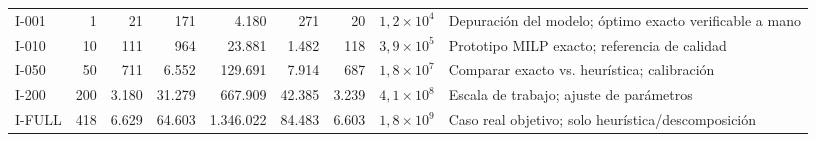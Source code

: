 
\begin{tabular}{l r r r r r r r L{3.4cm}}
 &  &  &  &  &  &  &  &  \\
\midrule
I-001 & 1 & 21 & 171 & 4.180 & 271 & 20 & $1{,}2\times 10^{4}$ & Depuración del modelo; óptimo exacto verificable a mano \\
I-010 & 10 & 111 & 964 & 23.881 & 1.482 & 118 & $3{,}9\times 10^{5}$ & Prototipo MILP exacto; referencia de calidad \\
I-050 & 50 & 711 & 6.552 & 129.691 & 7.914 & 687 & $1{,}8\times 10^{7}$ & Comparar exacto vs. heurística; calibración \\
I-200 & 200 & 3.180 & 31.279 & 667.909 & 42.385 & 3.239 & $4{,}1\times 10^{8}$ & Escala de trabajo; ajuste de parámetros \\
I-FULL & 418 & 6.629 & 64.603 & 1.346.022 & 84.483 & 6.603 & $1{,}8\times 10^{9}$ & Caso real objetivo; solo heurística/descomposición \\
\bottomrule
\end{tabular}
